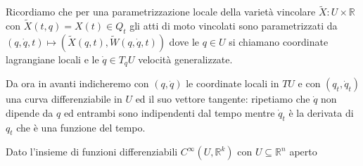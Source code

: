 \documentclass[11pt,a4paper,twoside]{book}
\theoremstyle{esss}
\theoremstyle{dotless}
\numberwithin{equation}{section} %
\begin{document}
Ricordiamo che per una parametrizzazione locale della varietà vincolare $\tilde{X}:U\times\mathbb{R}$ con $\tilde{X}(t,q)=X(t)\in Q_t$ gli atti di moto vincolati sono parametrizzati da $(q,\dot{q},t)\mapsto\left(\tilde{X}(q,t),\tilde{W}(q,\dot{q},t)\right)$ dove le $q\in U$ si chiamano coordinate lagrangiane locali e le $\dot{q}\in T_q U$ velocità generalizzate.

Da ora in avanti indicheremo con $(q,\dot{q})$ le coordinate locali in $TU$ e con $(q_t,\dot{q}_t)$ una curva differenziabile in $U$ ed il suo vettore tangente: ripetiamo che $\dot{q}$ non dipende da $q$ ed entrambi sono indipendenti dal tempo mentre $\dot{q}_t$ è la derivata di $q_t$ che è una funzione del tempo.

Dato l'insieme di funzioni differenziabili $C^{\infty}(U,\mathbb{R}^k) $ con $U\subseteq\mathbb{R}^n$ aperto
\end{document}
